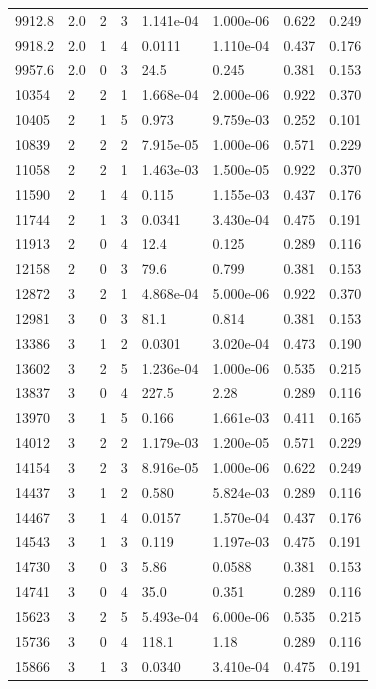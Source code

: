 \documentclass[preview]{standalone}
\begin{document}
{{{\begin{tabular}{L{1.2cm}C{1.2cm} C{0.3cm}C{0.5cm} C{1.4cm}C{1.4cm} C{1.4cm}C{1.4cm}}
  9912.8  &   2.0  & 2     &  3 &  1.141e-04  & 1.000e-06  & 0.622 &  0.249   \\ 
  9918.2  &   2.0  & 1     &  4 &  0.0111  & 1.110e-04  & 0.437 &  0.176   \\ 
  9957.6  &   2.0  & 0     &  3 &  24.5  & 0.245  & 0.381 &  0.153   \\ 
  10354  &     2  & 2     &  1 &  1.668e-04  & 2.000e-06  & 0.922 &  0.370   \\ 
  10405  &     2  & 1     &  5 &  0.973  & 9.759e-03  & 0.252 &  0.101   \\ 
  10839  &     2  & 2     &  2 &  7.915e-05  & 1.000e-06  & 0.571 &  0.229   \\ 
  11058  &     2  & 2     &  1 &  1.463e-03  & 1.500e-05  & 0.922 &  0.370   \\ 
  11590  &     2  & 1     &  4 &  0.115  & 1.155e-03  & 0.437 &  0.176   \\ 
  11744  &     2  & 1     &  3 &  0.0341  & 3.430e-04  & 0.475 &  0.191   \\ 
  11913  &     2  & 0     &  4 &  12.4  & 0.125  & 0.289 &  0.116   \\ 
  12158  &     2  & 0     &  3 &  79.6  & 0.799  & 0.381 &  0.153   \\ 
  12872  &     3  & 2     &  1 &  4.868e-04  & 5.000e-06  & 0.922 &  0.370   \\ 
  12981  &     3  & 0     &  3 &  81.1  & 0.814  & 0.381 &  0.153   \\ 
  13386  &     3  & 1     &  2 &  0.0301  & 3.020e-04  & 0.473 &  0.190   \\ 
  13602  &     3  & 2     &  5 &  1.236e-04  & 1.000e-06  & 0.535 &  0.215   \\ 
  13837  &     3  & 0     &  4 &  227.5  & 2.28  & 0.289 &  0.116   \\ 
  13970  &     3  & 1     &  5 &  0.166  & 1.661e-03  & 0.411 &  0.165   \\ 
  14012  &     3  & 2     &  2 &  1.179e-03  & 1.200e-05  & 0.571 &  0.229   \\ 
  14154  &     3  & 2     &  3 &  8.916e-05  & 1.000e-06  & 0.622 &  0.249   \\ 
  14437  &     3  & 1     &  2 &  0.580  & 5.824e-03  & 0.289 &  0.116   \\ 
  14467  &     3  & 1     &  4 &  0.0157  & 1.570e-04  & 0.437 &  0.176   \\ 
  14543  &     3  & 1     &  3 &  0.119  & 1.197e-03  & 0.475 &  0.191   \\ 
  14730  &     3  & 0     &  3 &  5.86  & 0.0588  & 0.381 &  0.153   \\ 
  14741  &     3  & 0     &  4 &  35.0  & 0.351  & 0.289 &  0.116   \\ 
  15623  &     3  & 2     &  5 &  5.493e-04  & 6.000e-06  & 0.535 &  0.215   \\ 
  15736  &     3  & 0     &  4 &  118.1  & 1.18  & 0.289 &  0.116   \\ 
  15866  &     3  & 1     &  3 &  0.0340  & 3.410e-04  & 0.475 &  0.191   \\ 
\hline 
\end{tabular} 

}}}
\end{document}
